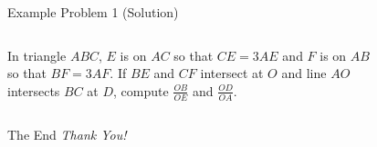 \documentclass{beamer}
\begin{document}
\begin{frame}{Example Problem 1 (Solution)}
	\begin{columns}
		In triangle $ABC$, $E$ is on $AC$ so that $CE = 3AE$ and $F$ is on  $AB$ so that $BF = 3AF$. If $BE$ and $CF$ intersect at $O$ and line $AO$ intersects $BC$ at $D$, compute $\frac{OB}{OE}$ and $\frac{OD}{OA}$.
		\begin{figure}[H]
			\begin{tikzpicture}
				
			\end{tikzpicture}
		\end{figure}
	\end{columns}
\end{frame}

\begin{frame}{The End}
\centering \Large
\emph{Thank You!}
\end{frame}
\end{document}
